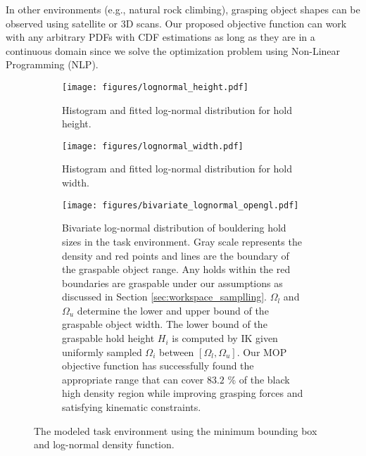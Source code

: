 \documentclass[letterpaper, 10 pt, conference]{ieeeconf}  %
\begin{document}
In other environments (e.g., natural rock climbing), grasping object shapes can be observed using satellite or 3D scans. Our proposed objective function can work with any arbitrary PDFs with CDF estimations as long as they are in a continuous domain since we solve the optimization problem using Non-Linear Programming (NLP). 

 \begin{figure}[t!]
 \centering
    \begin{subfigure}{0.2\textwidth}
\texttt{[image: figures/lognormal\_height.pdf]}
\caption{Histogram and fitted log-normal distribution for hold height. \label{fig:histogram_height}}
    \end{subfigure}
     \begin{subfigure}{0.2\textwidth}
         \centering
    \texttt{[image: figures/lognormal\_width.pdf]}
    \caption{Histogram and fitted log-normal distribution for hold width. \label{fig:histogram_width}}
     \end{subfigure}
          \begin{subfigure}{0.5\textwidth}
         \centering
    \texttt{[image: figures/bivariate\_lognormal\_opengl.pdf]}
    \label{fig:histogram}
    \caption{Bivariate log-normal distribution of bouldering hold sizes in the task environment. Gray scale represents the density and red points and lines are the boundary of the graspable object range. Any holds within the red boundaries are graspable under our assumptions as discussed in Section \ref{sec:workspace_samplling}. $\Omega_{l}$ and $\Omega_{u}$ determine the lower and upper bound of the graspable object width. The lower bound of the graspable hold height $H_i$ is computed by IK given uniformly sampled $\Omega_i$ between $[\Omega_{l}, \Omega_{u}]$. Our MOP objective function has successfully found the appropriate range that can cover $83.2$ \% of the black high density region while improving grasping forces and satisfying kinematic constraints. \label{fig:bivariate}}
    \label{leg1}
     \end{subfigure}
     \caption{The modeled task environment using the minimum bounding box and log-normal density function.}
\end{figure} 
\end{document}

